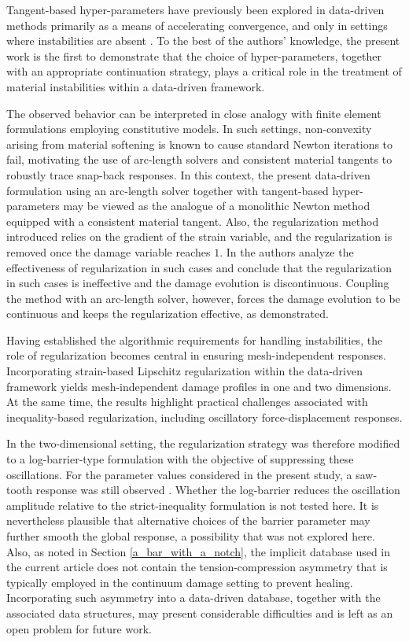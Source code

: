 \documentclass[10pt]{cas-sc}
\newcommand{\deleted}[1]{}
\newcommand{\added}[1]{#1}
\begin{document}
Tangent-based hyper-parameters have previously been explored in data-driven methods primarily as a means of accelerating convergence, and only in settings where instabilities are absent \cite{Pham2023,Nguyen2022,Kanno2019}. To the best of the authors’ knowledge, the present work is the first to demonstrate that the choice of hyper-parameters, together with an appropriate continuation strategy, plays a critical role in the treatment of material instabilities within a data-driven framework.

The observed behavior can be interpreted in close analogy with finite element formulations employing constitutive models. In such settings, non-convexity arising from material softening is known to cause standard Newton iterations to fail, motivating the use of arc-length solvers and consistent material tangents to robustly trace snap-back responses. In this context, the present data-driven formulation using an arc-length solver together with tangent-based hyper-parameters may be viewed as the analogue of a monolithic Newton method equipped with a consistent material tangent. Also, the regularization method introduced relies on the gradient of the strain variable, and the regularization is removed once the damage variable reaches $1$. In \cite{le2018strain} the authors analyze the effectiveness of regularization in such cases and conclude that the regularization in such cases is ineffective and the damage evolution is discontinuous. Coupling the method with an arc-length solver, however, forces the damage evolution to be continuous and keeps the regularization effective, as demonstrated.

Having established the algorithmic requirements for handling instabilities, the role of regularization becomes central in ensuring mesh-independent responses. Incorporating strain-based Lipschitz regularization within the data-driven framework yields mesh-independent damage profiles in one and two dimensions. At the same time, the results highlight practical challenges associated with inequality-based regularization, including oscillatory force-displacement responses.

In the two-dimensional setting, the regularization strategy was therefore modified to a log-barrier-type formulation with the objective of suppressing these oscillations. For the parameter values considered in the present study, a saw-tooth response was still observed \deleted{, indicating that the oscillations are reduced but not completely eliminated}\added{. Whether the log-barrier reduces the oscillation amplitude relative to the strict-inequality formulation is not tested here}. It is nevertheless plausible that alternative choices of the barrier parameter may further smooth the global response, a possibility that was not explored here. \added{Also, as noted in Section \ref{a_bar_with_a_notch}, the implicit database used in the current article does not contain the tension-compression asymmetry that is typically employed in the continuum damage setting to prevent healing. Incorporating such asymmetry into a data-driven database, together with the associated data structures, may present considerable difficulties and is left as an open problem for future work.}
\end{document}
